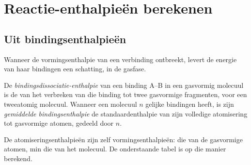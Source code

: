 \section{Reactie-enthalpieën berekenen}

\subsection*{Uit bindingsenthalpieën}

Wanneer de vormingsenthalpie van een verbinding ontbreekt, levert de energie van haar
bindingen een schatting, in de gasfase.

\begin{definition}\label{def:b2:reaction-enthalpy:bond-enthalpy}
De \emph{bindingsdissociatie-enthalpie} van
een binding A--B in een gasvormig molecuul is de  van het
verbreken van die binding tot twee gasvormige fragmenten, 
voor een tweeatomig molecuul. Wanneer een molecuul $n$ gelijke bindingen heeft, is zijn
\emph{gemiddelde bindingsenthalpie} de standaardenthalpie
van zijn volledige atomisering tot gasvormige atomen, gedeeld door $n$.
\end{definition}

De atomiseringsenthalpieën zijn zelf vormingsenthalpieën: die van
de gasvormige atomen, min die van het molecuul. De onderstaande tabel is
op die manier berekend.


